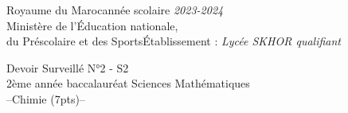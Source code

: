 \documentclass[12pt]{article}
\newcommand\headerMe[2]{\noindent{}#1\hfill#2}
\begin{document}
\headerMe{Royaume du Maroc}{année scolaire \emph{2023-2024}}\\
\headerMe{Ministère de l'Éducation nationale, }{  }\\
\headerMe{du Préscolaire et des Sports}{Établissement : \emph{Lycée SKHOR qualifiant}}\\
\vspace{-1cm}
\begin{center}
	Devoir Surveillé  N°2 - S2 \\

	2ème année baccalauréat Sciences Mathématiques\\
	\hrulefill
  \Large{--Chimie (7pts)--}
	\hrulefill\\


	\vspace{-.2cm}
\end{center}
\end{document}
